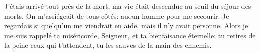 J’étais arrivé tout près de la mort,
	ma vie était descendue au seuil du séjour des morts.
On m’assiégeait de tous côtés: aucun homme pour me secourir.
Je regardais si quelqu’un me viendrait en aide,
	mais il n’y avait personne.
Alors je me suis rappelé ta miséricorde, Seigneur, et ta bienfaisance éternelle:
	tu retires de la peine ceux qui t’attendent,
	tu les sauves de la main des ennemis.
